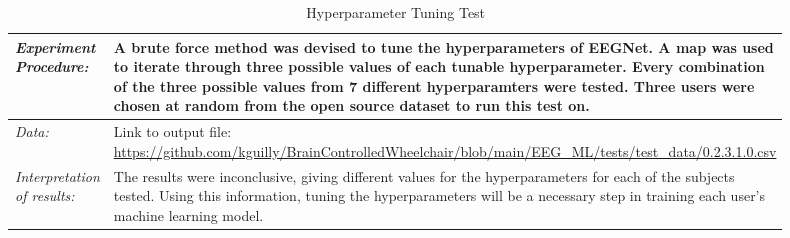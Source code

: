 \documentclass[conference]{IEEEtran}
\begin{document}
\begin{table}[!ht]
\begin{tabular}{|>{\columncolor{black!5}}p{0.25\linewidth}|>{}p{0.65\linewidth}|}
            \textit{Experiment Procedure:} & A brute force method was devised to tune the hyperparameters of EEGNet. A map was used to iterate through three possible values of each tunable hyperparameter. Every combination of the three possible values from 7 different hyperparamters were tested. Three users were chosen at random from the open source dataset to run this test on. 
            \\ \hline 

            \textit{Data:} & Link to output file: \url{https://github.com/kguilly/BrainControlledWheelchair/blob/main/EEG_ML/tests/test_data/0.2.3.1.0.csv} 

            \\ \hline 

            \textit{Interpretation of results:} & The results were inconclusive, giving different values for the hyperparameters for each of the subjects tested. Using this information, tuning the hyperparameters will be a necessary step in training each user's machine learning model. 

            \\ \hline

        \end{tabular}           
        \caption{Hyperparameter Tuning Test}
        \label{tab:hyperparameter_tuning_test}
    \end{table}
\end{document}
